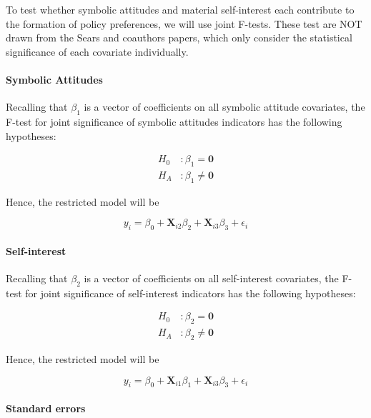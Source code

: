 \documentclass[]{article}
\let\oldparagraph\paragraph
\renewcommand{\paragraph}[1]{\oldparagraph{#1}\mbox{}}
\begin{document}
To test whether symbolic attitudes and material self-interest each
contribute to the formation of policy preferences, we will use joint
F-tests. These test are NOT drawn from the Sears and coauthors papers,
which only consider the statistical significance of each covariate
individually.

\paragraph{Symbolic Attitudes}\label{symbolic-attitudes}

Recalling that \(\beta_1\) is a vector of coefficients on all symbolic
attitude covariates, the F-test for joint significance of symbolic
attitudes indicators has the following hypotheses:

\[\begin{aligned}
H_0 \  &: \beta_1 = \textbf{0}\\ H_A&: \beta_1 \neq \textbf{0}
\end{aligned}\]

Hence, the restricted model will be

\begin{equation}
y_i = \beta_0 + \textbf{X}_{i2}\beta_2 +  \textbf{X}_{i3}\beta_3 + \epsilon_i
\end{equation}

\paragraph{Self-interest}\label{self-interest}

Recalling that \(\beta_2\) is a vector of coefficients on all
self-interest covariates, the F-test for joint significance of
self-interest indicators has the following hypotheses:

\[\begin{aligned}
H_0\ &: \beta_2 = \textbf{0}\\ H_A &: \beta_2 \neq \textbf{0}
\end{aligned}\]

Hence, the restricted model will be

\begin{equation}
y_i = \beta_0 + \textbf{X}_{i1}\beta_1 +  \textbf{X}_{i3}\beta_3 + \epsilon_i
\end{equation}

\paragraph{Standard errors}\label{standard-errors}
\end{document}

